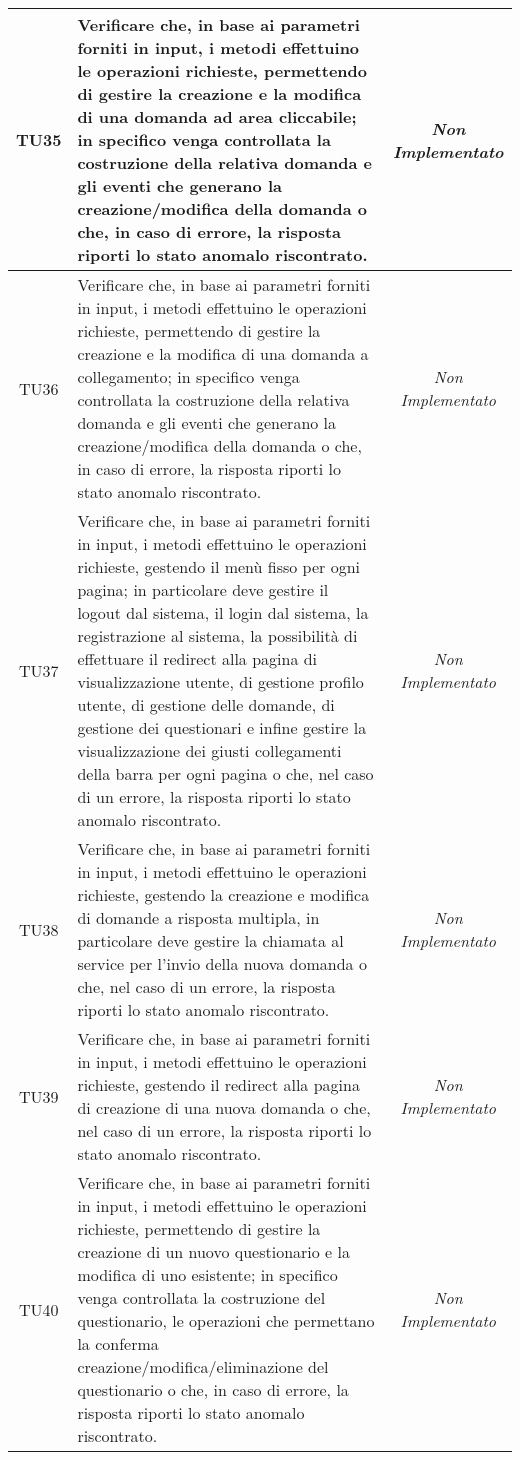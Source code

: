 \begin{longtable}{|c|>{}m{10cm}|c|}
\hypertarget{TU35}{TU35} & Verificare che, in base ai parametri forniti in input, i metodi effettuino le operazioni richieste, permettendo di gestire la creazione e la modifica di una domanda ad area cliccabile; in specifico venga controllata la costruzione della relativa domanda e gli eventi che generano la creazione/modifica della domanda  o che, in caso di errore, la risposta riporti lo stato anomalo riscontrato. & \textit{Non Implementato}\\ \hline
\hypertarget{TU36}{TU36} & Verificare che, in base ai parametri forniti in input, i metodi effettuino le operazioni richieste, permettendo di gestire la creazione e la modifica di una domanda a collegamento; in specifico venga controllata la costruzione della relativa domanda e gli eventi che generano la creazione/modifica della domanda o che, in caso di errore, la risposta riporti lo stato anomalo riscontrato. & \textit{Non Implementato}\\ \hline
\hypertarget{TU37}{TU37} & Verificare che, in base ai parametri forniti in input, i metodi effettuino le operazioni richieste, gestendo il menù fisso per ogni pagina; in particolare deve gestire il logout dal sistema, il login dal sistema, la registrazione al sistema, la possibilità di effettuare il redirect alla pagina di visualizzazione utente, di gestione profilo utente, di gestione delle domande, di gestione dei questionari e infine gestire la visualizzazione dei giusti collegamenti della barra per ogni pagina o che, nel caso di un errore, la risposta riporti lo stato anomalo riscontrato. & \textit{Non Implementato}\\ \hline
\hypertarget{TU38}{TU38} & Verificare che, in base ai parametri forniti in input, i metodi effettuino le operazioni richieste, gestendo la creazione e modifica di domande a risposta multipla, in particolare deve gestire la chiamata al service per l'invio della nuova domanda o che, nel caso di un errore, la risposta riporti lo stato anomalo riscontrato. & \textit{Non Implementato}\\ \hline
\hypertarget{TU39}{TU39} & Verificare che, in base ai parametri forniti in input, i metodi effettuino le operazioni richieste, gestendo il redirect alla pagina di creazione di una nuova domanda o che, nel caso di un errore, la risposta riporti lo stato anomalo riscontrato. & \textit{Non Implementato}\\ \hline
\hypertarget{TU40}{TU40} & Verificare che, in base ai parametri forniti in input, i metodi effettuino le operazioni richieste, permettendo di gestire la creazione di un nuovo questionario e la modifica di uno esistente; in specifico venga controllata la costruzione del questionario, le operazioni che permettano la conferma creazione/modifica/eliminazione del questionario o che, in caso di errore, la risposta riporti lo stato anomalo riscontrato. & \textit{Non Implementato}\\ \hline

\end{longtable}

